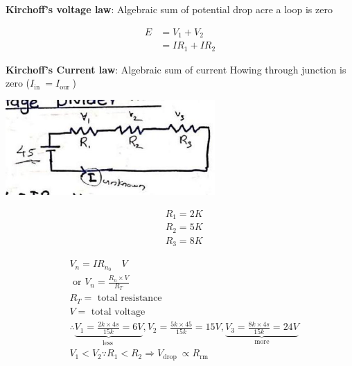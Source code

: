 \documentclass[12pt, a4paper]{article}
\newcommand{\figwidth}{8cm}
\begin{document}
\textbf{Kirchoff's voltage law}: Algebraic sum of potential drop acre a loop is zero

$$
	\begin{aligned}
		E & =V_{1}+V_{2} \\
		  & =I R_1+I R_2
	\end{aligned}
$$

\textbf{Kirchoff's Current law}: Algebraic sum of current Howing through junction is zero
($I_{\text {in }}=I_{\text {our }}$)


\begin{center}
	\includegraphics[max width=\figwidth]{2024_06_15_f9b8f5fbbfa74e15de4eg-2(3)}
\end{center}

$$
	\begin{aligned}
		 & R_1=2 K \\
		 & R_2=5 K \\
		 & R_3=8 K
	\end{aligned}
$$

$$
	\begin{aligned}
		 & V_n = I R_{n_0} \quad V                                                                                                                                                                  \\
		 & \text { or } V_n=\frac{R_{n} \times V}{R_T}                                                                                                                                              \\
		 & R_T = \text { total resistance }                                                                                                                                                         \\
		 & V=\text { total voltage }                                                                                                                                                                \\
		 & \therefore \underbrace{V_{1}=\frac{2 k \times 4 s}{15 k}=6 V}_{\text {less }}, V_{2}=\frac{5 k \times 45}{15 k}=15 V, \underbrace {V_{3}=\frac{8 k \times 4 s}{15 k}=24 V}_{\text{more}} \\
		 & V_1<V_{2} \because R_1<R_2 \Rightarrow V_{\text {drop }} \propto R_{\text {rm }}
	\end{aligned}
$$
\end{document}
